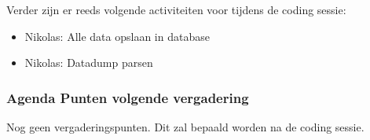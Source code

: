 Verder zijn er reeds volgende activiteiten voor tijdens de coding sessie:
\begin{itemize}
	\item Nikolas: Alle data opslaan in database
	\item Nikolas: Datadump parsen
\end{itemize}

\subsubsection{Agenda Punten volgende vergadering}
Nog geen vergaderingspunten. Dit zal bepaald worden na de coding sessie.